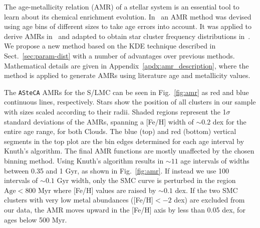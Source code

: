 \documentclass{aa}
\begin{document}
The age-metallicity relation (AMR) of a stellar system is an essential tool to learn
about its chemical enrichment evolution.
%
In~\cite{Piatti_2010_AMR} an AMR method was devised using age bins of different
sizes to take age errors into account. It was applied to derive AMRs
in~\cite{Piatti_Geisler_2013} and adapted to obtain star cluster frequency
distributions in~\cite{Piatti_2013_CF}.
%
We propose a new method based on the KDE technique described in
Sect.~\ref{sec:param-dist} with a number of advantages over previous methods.
Mathematical details are given in Appendix~\ref{apdx:amr_description}, where
the method is applied to generate AMRs using literature age and metallicity
values.

The \texttt{ASteCA} AMRs for the S/LMC can be seen in Fig.~\ref{fig:amr} as red
and blue continuous lines, respectively. Stars show the position of all clusters
in our sample with sizes scaled according to their radii.
%
Shaded regions represent the 1$\sigma$ standard deviations of the AMRs, spanning
a [Fe/H] width of ${\sim}0.2$ dex for the entire age range, for both Clouds.
The blue (top) and red (bottom) vertical segments in the top plot are the bin
edges determined for each age interval by Knuth's algorithm.
%
The final AMR functions are mostly unaffected by the chosen binning method.
Using Knuth's algorithm results in ${\sim}11$ age intervals of widths between
0.35 and 1 Gyr, as shown in Fig.~\ref{fig:amr}. If instead we use 100 intervals
of ${\sim}0.1$ Gyr width, only the SMC curve is perturbed in the region
$\mathrm{Age}{<800}$ Myr where [Fe/H] values are raised by ${\sim}0.1$ dex.
%
%
If the two SMC clusters with very low metal abundances ([Fe/H]${<-}2$ dex) are
excluded from our data, the AMR moves upward in the [Fe/H] axis by less than
0.05 dex, for ages below 500 Myr.
\end{document}
